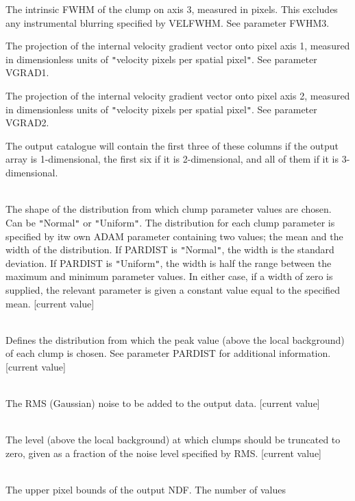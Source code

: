 \documentclass[twoside,11pt]{article}
\renewcommand{\_}{\texttt{\symbol{95}}}
\newcommand{\sstsubsection}[1]{ \item[{#1}] \mbox{} \\}
\newcommand{\sstitem}{\item}
\newcommand{\sstsubsection}[1]{\item[{#1}]}
\newcommand{\sstitem}{\item}
\begin{document}
{{{{            \sstitem
               The intrinsic FWHM of the clump on axis 3, measured in
               pixels. This excludes any instrumental blurring specified by
               VELFWHM. See parameter FWHM3.

            \sstitem
               The projection of the internal velocity gradient vector
               onto pixel axis 1, measured in dimensionless units of
               {\tt "}velocity pixels per spatial pixel{\tt "}. See parameter VGRAD1.

            \sstitem
               The projection of the internal velocity gradient vector
               onto pixel axis 2, measured in dimensionless units of
               {\tt "}velocity pixels per spatial pixel{\tt "}. See parameter VGRAD2.

         }
         The output catalogue will contain the first three of these columns
         if the output array is 1-dimensional, the first six if it is
         2-dimensional, and all of them if it is 3-dimensional.
      }
      \sstsubsection{
         PARDIST = LITERAL (Read)
      }{
         The shape of the distribution from which clump parameter values are
         chosen. Can be {\tt "}Normal{\tt "} or {\tt "}Uniform{\tt "}. The distribution for each
         clump parameter is specified by itw own ADAM parameter containing
         two values; the mean and the width of the distribution. If PARDIST
         is {\tt "}Normal{\tt "}, the width is the standard deviation. If PARDIST is
         {\tt "}Uniform{\tt "}, the width is half the range between the maximum and
         minimum parameter values. In either case, if a width of zero is
         supplied, the relevant parameter is given a constant value equal
         to the specified mean. [current value]
      }
      \sstsubsection{
         PEAK( 2 ) = \_REAL (Read)
      }{
         Defines the distribution from which the peak value (above the
         local background) of each clump is chosen. See parameter PARDIST
         for additional information. [current value]
      }
      \sstsubsection{
         RMS = \_REAL (Read)
      }{
         The RMS (Gaussian) noise to be added to the output data. [current value]
      }
      \sstsubsection{
         TRUNC = \_REAL (Read)
      }{
         The level (above the local background) at which clumps should be
         truncated to zero, given as a fraction of the noise level specified
         by RMS. [current value]
      }
      \sstsubsection{
         UBND() = \_INTEGER (Read)
      }{
         The upper pixel bounds of the output NDF. The number of values
}}}
\end{document}

